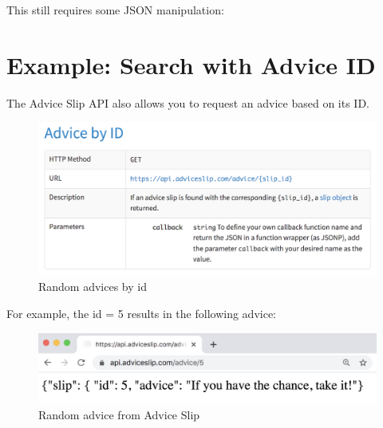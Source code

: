\documentclass[
]{book}
\newenvironment{Shaded}{\begin{snugshade}}{\end{snugshade}}
\newcommand{\CommentTok}[1]{\textcolor[rgb]{0.56,0.35,0.01}{\textit{#1}}}
\newcommand{\FunctionTok}[1]{\textcolor[rgb]{0.13,0.29,0.53}{\textbf{#1}}}
\newcommand{\NormalTok}[1]{#1}
\newcommand{\OtherTok}[1]{\textcolor[rgb]{0.56,0.35,0.01}{#1}}
\begin{document}
This still requires some JSON manipulation:

\begin{Shaded}
\end{Shaded}

\hypertarget{example-search-with-advice-id}{%
\section{Example: Search with Advice ID}\label{example-search-with-advice-id}}

The Advice Slip API also allows you to request an advice based on its ID.

\begin{figure}

{\centering \includegraphics[width=0.75\linewidth]{images/api/advice-slip-by-id} 

}

\caption{Random advices by id}\label{fig:unnamed-chunk-130}
\end{figure}

For example, the id = 5 results in the following advice:

\begin{figure}

{\centering \includegraphics[width=0.7\linewidth]{images/api/advice-slip-id5} 

}

\caption{Random advice from Advice Slip}\label{fig:unnamed-chunk-131}
\end{figure}
\end{document}
